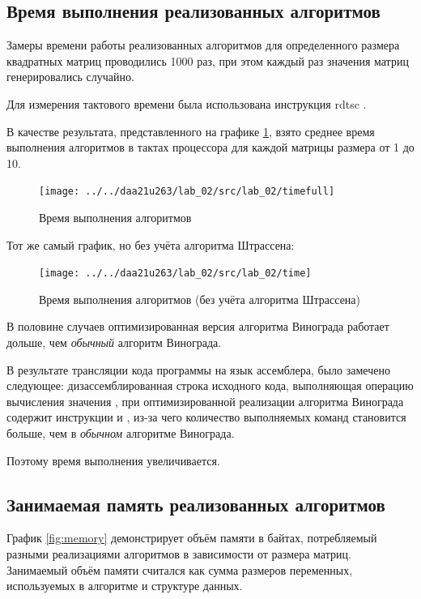 \newpage

\subsection{Время выполнения реализованных алгоритмов}
Замеры времени работы реализованных алгоритмов для определенного размера квадратных матриц проводились 1000 раз, при этом каждый раз значения матриц генерировались случайно.

Для измерения тактового времени была использована инструкция rdtsc \cite{microsoft_rdtsc}.

В качестве результата, представленного на графике \ref{fig:timefull}, взято среднее время выполнения алгоритмов в тактах процессора для каждой матрицы размера от 1 до 10.

\begin{figure}
	\centering
	\texttt{[image: ../../daa21u263/lab\_02/src/lab\_02/timefull]}
	\caption{Время выполнения алгоритмов}
	\label{fig:timefull}
\end{figure}

Тот же самый график, но без учёта алгоритма Штрассена:

\begin{figure}
	\centering
	\texttt{[image: ../../daa21u263/lab\_02/src/lab\_02/time]}
	\caption{Время выполнения алгоритмов (без учёта алгоритма Штрассена)}
	\label{fig:time}
\end{figure}

В половине случаев оптимизированная версия алгоритма Винограда работает дольше, чем \textit{обычный} алгоритм Винограда.

В результате трансляции кода программы на язык ассемблера, было замечено следующее: дизассемблированная строка исходного кода, выполняющая операцию вычисления значения , при оптимизированной реализации алгоритма Винограда содержит инструкции  и , из-за чего количество выполняемых команд становится больше, чем в \textit{обычном} алгоритме Винограда.

Поэтому время выполнения увеличивается.

\newpage

\subsection{Занимаемая память реализованных алгоритмов}
 
График \ref{fig:memory} демонстрирует объём памяти в байтах, потребляемый разными реализациями алгоритмов в зависимости от размера матриц.
Занимаемый объём памяти считался как сумма размеров переменных, используемых в алгоритме и структуре данных.


